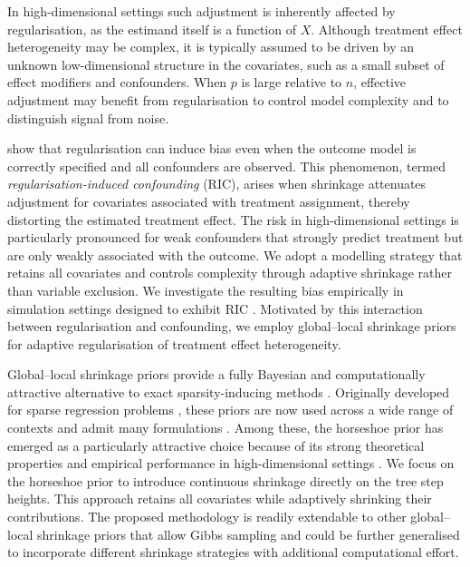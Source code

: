 In high-dimensional settings such adjustment is inherently affected by regularisation, as the estimand itself is a function of $X$.
Although treatment effect heterogeneity may be complex, it is typically assumed to be driven by an unknown low-dimensional structure in the covariates, such as a small subset of effect modifiers and confounders.
When $p$ is large relative to $n$, effective adjustment may benefit from regularisation to control model
complexity and to distinguish signal from noise.



\cite{hahn2018regularization} show that regularisation can induce bias even when the outcome model is correctly specified and all confounders are observed. 
This phenomenon, termed \textit{regularisation-induced confounding} (RIC), arises when shrinkage attenuates adjustment for covariates associated with treatment assignment, thereby distorting the estimated treatment effect. 
The risk in high-dimensional settings is particularly pronounced for weak confounders that strongly predict treatment but are only weakly associated with the outcome.
We adopt a modelling strategy that retains all covariates and controls complexity through adaptive shrinkage rather than variable exclusion.
We investigate the resulting bias empirically in simulation settings designed to exhibit RIC \citep{hahn2020bayesian}.
Motivated by this interaction between regularisation and confounding, we employ global--local shrinkage priors for adaptive regularisation of treatment effect heterogeneity.


Global--local shrinkage priors provide a fully Bayesian and computationally attractive alternative to exact sparsity-inducing methods \citep{Mitchell1988SpikeSlab, Liu2021ABC}. 
Originally developed for sparse regression problems \citep{OriginalHorseshoe}, these priors are now used across a wide range of contexts \citep{Kowal2019DynamicShrinkage, Li2019GraphicalHorseshoe, Louizos2017BayesianCompression} and admit many formulations \citep{tipping2001, johnstone2004, Bhadra2019}\citep{park2008}. 
Among these, the horseshoe prior has emerged as a particularly attractive choice because of its strong theoretical properties and empirical performance in high-dimensional settings \citep{vdPas2017Horseshoe, hahn2020bayesian, DattaGhosh2013, vdPas2014, vdPas2017, bhadra2019lasso}. 
We focus on the horseshoe prior to introduce continuous shrinkage directly on the tree step heights.
This approach retains all covariates while adaptively shrinking their contributions. 
The proposed methodology is readily extendable to other global--local shrinkage priors that allow Gibbs sampling and could be further generalised to incorporate different shrinkage strategies with additional computational effort.

